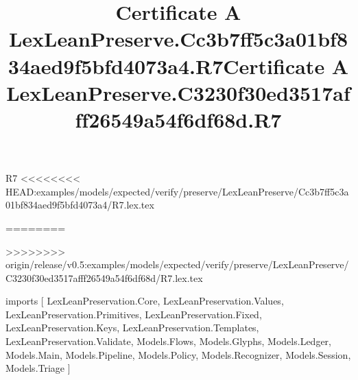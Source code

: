 \begin{lexlean}{R7}
<<<<<<<< HEAD:examples/models/expected/verify/preserve/LexLeanPreserve/Cc3b7ff5c3a01bf834aed9f5bfd4073a4/R7.lex.tex
\title{Certificate A LexLeanPreserve.Cc3b7ff5c3a01bf834aed9f5bfd4073a4.R7}
========
\title{Certificate A LexLeanPreserve.C3230f30ed3517afff26549a54f6df68d.R7}
>>>>>>>> origin/release/v0.5:examples/models/expected/verify/preserve/LexLeanPreserve/C3230f30ed3517afff26549a54f6df68d/R7.lex.tex
\begin{coremodule}
imports [
  LexLeanPreservation.Core,
  LexLeanPreservation.Values,
  LexLeanPreservation.Primitives,
  LexLeanPreservation.Fixed,
  LexLeanPreservation.Keys,
  LexLeanPreservation.Templates,
  LexLeanPreservation.Validate,
  Models.Flows,
  Models.Glyphs,
  Models.Ledger,
  Models.Main,
  Models.Pipeline,
  Models.Policy,
  Models.Recognizer,
  Models.Session,
  Models.Triage
]


\end{coremodule}
\end{lexlean}
